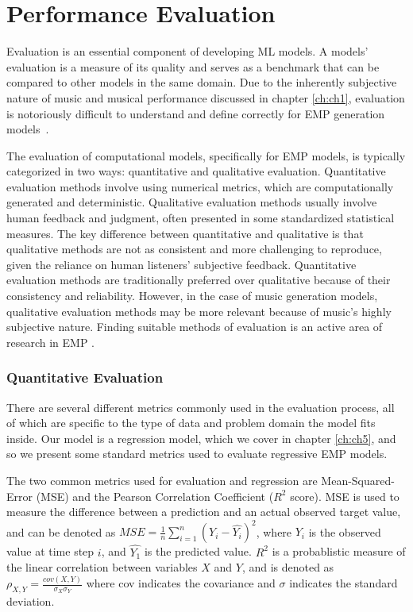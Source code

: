 \section{Performance Evaluation}\label{sec:evaluation}
Evaluation is an essential component of developing ML models. A models' evaluation is a measure of its quality and serves as a benchmark that can be compared to other models in the same domain. Due to the inherently subjective nature of music and musical performance discussed in chapter \ref{ch:ch1}, evaluation is notoriously difficult to understand and define correctly for EMP generation models~\cite{cancino2018computational}. 

The evaluation of computational models, specifically for EMP models, is typically categorized in two ways: quantitative and qualitative evaluation. Quantitative evaluation methods involve using numerical metrics, which are computationally generated and deterministic. Qualitative evaluation methods usually involve human feedback and judgment, often presented in some standardized statistical measures. The key difference between quantitative and qualitative is that qualitative methods are not as consistent and more challenging to reproduce, given the reliance on human listeners' subjective feedback. Quantitative evaluation methods are traditionally preferred over qualitative because of their consistency and reliability. However, in the case of music generation models, qualitative evaluation methods may be more relevant because of music's highly subjective nature. Finding suitable methods of evaluation is an active area of research in EMP \cite{cancino2018computational}. 

\subsubsection{Quantitative Evaluation}
There are several different metrics commonly used in the evaluation process, all of which are specific to the type of data and problem domain the model fits inside. Our model is a regression model, which we cover in chapter \ref{ch:ch5}, and so we present some standard metrics used to evaluate regressive EMP models. 

The two common metrics used for evaluation and regression are Mean-Squared-Error (MSE) and the Pearson Correlation Coefficient ($R^2$ score). MSE is used to measure the difference between a prediction and an actual observed target value, and can be denoted as $MSE = \frac{1}{n}\sum_{i=1}^{n}(Y_i - \hat{Y_i})^2$, where $Y_i$ is the observed value at time step $i$, and $\hat{Y_1}$ is the predicted value. $R^2$ is a probablistic measure of the linear correlation between variables $X$ and $Y$, and is denoted as $\rho_{X,Y} = \frac{cov(X,Y)}{\sigma_{X}\sigma_{Y}}$ where cov indicates the covariance and $\sigma$ indicates the standard deviation.

